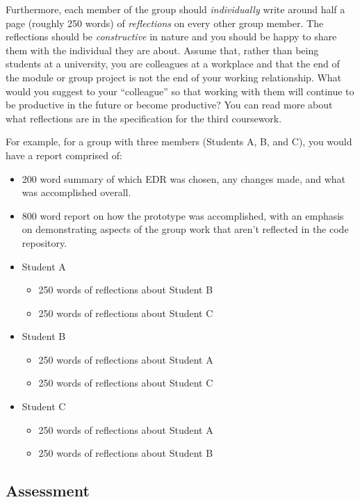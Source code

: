 Furthermore, each member of the group should \emph{individually} write around half a page (roughly 250 words) of \emph{reflections} on every other group member. The reflections should be \emph{constructive} in nature and you should be happy to share them with the individual they are about. Assume that, rather than being students at a university, you are colleagues at a workplace and that the end of the module or group project is not the end of your working relationship. What would you suggest to your ``colleague'' so that working with them will continue to be productive in the future or become productive? You can read more about what reflections are in the specification for the third coursework.

For example, for a group with three members (Students A, B, and C), you would have a report comprised of:

\begin{itemize}
    \item 200 word summary of which EDR was chosen, any changes made, and what was accomplished overall.
    \item 800 word report on how the prototype was accomplished, with an emphasis on demonstrating aspects of the group work that aren't reflected in the code repository.
    \item Student A
    \begin{itemize}
        \item 250 words of reflections about Student B
        \item 250 words of reflections about Student C
    \end{itemize}
    \item Student B
    \begin{itemize}
        \item 250 words of reflections about Student A
        \item 250 words of reflections about Student C
    \end{itemize}
    \item Student C
    \begin{itemize}
        \item 250 words of reflections about Student A
        \item 250 words of reflections about Student B
    \end{itemize}
\end{itemize}

\subsection{Assessment}

